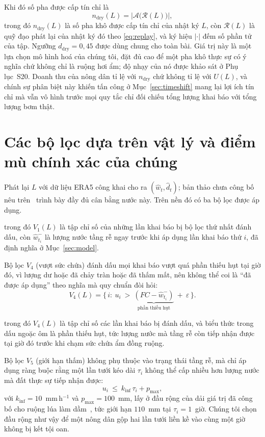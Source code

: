 Khi đó số pha được cấp tín chỉ là
\begin{equation}
n_{\mathrm{dry}}(L)=\bigl|\mathcal{A}\bigl(\mathcal{R}(L)\bigr)\bigr|,
\label{eq:ndry}
\end{equation}
trong đó $n_{\mathrm{dry}}(L)$ là số pha khô được cấp tín chỉ của nhật ký $L$, còn
$\mathcal{R}(L)$ là quỹ đạo phát lại của nhật ký đó theo \eqref{eq:replay}, và ký
hiệu $|\cdot|$ đếm số phần tử của tập. Ngưỡng $d_{\mathrm{dry}}=0{,}45$ được dùng
chung cho toàn bài. Giá trị này là một lựa chọn mô hình hoá của chúng tôi, đặt đủ cao để một pha khô thực sự có ý nghĩa
chứ không chỉ là ruộng hơi ẩm; độ nhạy của nó được khảo sát ở Phụ lục~S20.
Doanh thu của nông dân tỉ lệ với $n_{\mathrm{dry}}$ chứ không tỉ lệ với $U(L)$,
và chính sự phân biệt này khiến tấn công ở Mục~\ref{sec:timeshift} mang lại lợi
ích tín chỉ mà vẫn vô hình trước mọi quy tắc chỉ đối chiếu tổng lượng khai báo
với tổng lượng bơm thật.

\section{Các bộ lọc dựa trên vật lý và điểm mù chính xác của chúng}
\label{sec:filters}

Phát lại $L$ với dữ liệu ERA5 công khai cho ra $(\hat w_t,\hat d_t)$; bản thảo chưa công bố nêu trên~\cite{twingate2026} trình bày đầy đủ cân bằng nước này. Trên nền đó có
ba bộ lọc được áp dụng.

trong đó $V_1(L)$ là tập chỉ số của những lần khai báo bị bộ lọc thứ nhất đánh dấu,
còn $\hat w_{t_i}^{-}$ là lượng nước tầng rễ ngay trước khi áp dụng lần khai báo
thứ $i$, đã định nghĩa ở Mục~\ref{sec:model}.

Bộ lọc \emph{$V_4$} (vượt sức chứa) đánh dấu mọi khai báo vượt quá phần thiếu hụt
tại giờ đó, vì lượng dư hoặc đã chảy tràn hoặc đã thấm mất, nên không thể coi là
``đã được áp dụng'' theo nghĩa mà quy chuẩn đòi hỏi:
\begin{equation}
V_4(L)=\{\,i:\ u_i\ >\ \underbrace{(FC-\hat w_{t_i}^{-})}_{\text{phần thiếu hụt}}
\ +\ \varepsilon\,\}.
\label{eq:v4}
\end{equation}

trong đó $V_4(L)$ là tập chỉ số các lần khai báo bị đánh dấu, và biểu thức trong
dấu ngoặc ôm là phần thiếu hụt, tức lượng nước mà tầng rễ còn tiếp nhận được tại
giờ đó trước khi chạm sức chứa ẩm đồng ruộng.

Bộ lọc \emph{$V_5$} (giới hạn thấm) không phụ thuộc vào trạng thái tầng rễ, mà
chỉ áp dụng ràng buộc rằng một lần tưới kéo dài $\tau_i$ không thể cấp nhiều hơn
lượng nước mà đất thực sự tiếp nhận được:
\begin{equation}
u_i\ \le\ k_{\mathrm{inf}}\,\tau_i+p_{\max},
\label{eq:v5}
\end{equation}
với $k_{\mathrm{inf}}=10$~mm\,h$^{-1}$ và $p_{\max}=100$~mm, lấy ở đầu rộng của dải giá
trị đã công bố cho ruộng lúa làm dầm~\cite{kukal2004,bouman2001}, tức giới hạn
$110$~mm tại $\tau_i=1$~giờ. Chúng tôi chọn đầu rộng như vậy để một nông dân gộp
hai lần tưới liền kề vào cùng một giờ không bị kết tội oan.


